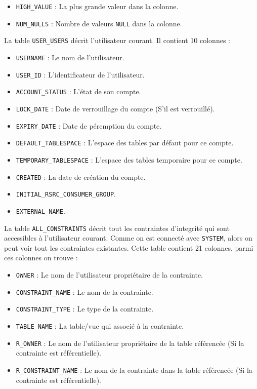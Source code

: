 \documentclass[12pt,a4paper]{article}
\begin{document}
\begin{enumerate}
\begin{itemize}
		\item \texttt{HIGH\_VALUE} : La plus grande valeur dans la colonne.
		\item \texttt{NUM\_NULLS} : Nombre de valeurs \texttt{NULL} dans la colonne.
	\end{itemize}
	La table \texttt{USER\_USERS} décrit l'utilisateur courant. Il contient 10 colonnes :
	\begin{itemize}
		\item \texttt{USERNAME} : Le nom de l'utilisateur.
		\item \texttt{USER\_ID} : L'identificateur de l'utilisateur.
		\item \texttt{ACCOUNT\_STATUS} : L'état de son compte.
		\item \texttt{LOCK\_DATE} : Date de verrouillage du compte (S'il est verrouillé).
		\item \texttt{EXPIRY\_DATE} : Date de péremption du compte.
		\item \texttt{DEFAULT\_TABLESPACE} : L'espace des tables par défaut pour ce compte.
		\item \texttt{TEMPORARY\_TABLESPACE} : L'espace des tables temporaire pour ce compte.
		\item \texttt{CREATED} : La date de création du compte.
		\item \texttt{INITIAL\_RSRC\_CONSUMER\_GROUP}.
		\item \texttt{EXTERNAL\_NAME}.
	\end{itemize}
	La table \texttt{ALL\_CONSTRAINTS} décrit tout les contraintes d'integrité qui sont accessibles à l'utilisateur courant.
	Comme on est connecté avec \texttt{SYSTEM}, alors on peut voir tout les contraintes existantes.
	Cette table contient 21 colonnes, parmi ces colonnes on trouve :
	\begin{itemize}
		\item \texttt{OWNER} : Le nom de l'utilisateur propriétaire de la contrainte.
		\item \texttt{CONSTRAINT\_NAME} : Le nom de la contrainte.
		\item \texttt{CONSTRAINT\_TYPE} : Le type de la contrainte.
		\item \texttt{TABLE\_NAME} : La table/vue qui associé à la contrainte.
		\item \texttt{R\_OWNER} : Le nom de l'utilisateur propriétaire de la table référencée (Si la contrainte est référentielle).
		\item \texttt{R\_CONSTRAINT\_NAME} : Le nom de la contrainte dans la table référencée (Si la contrainte est référentielle).

\end{itemize}
\end{enumerate}
\end{document}
